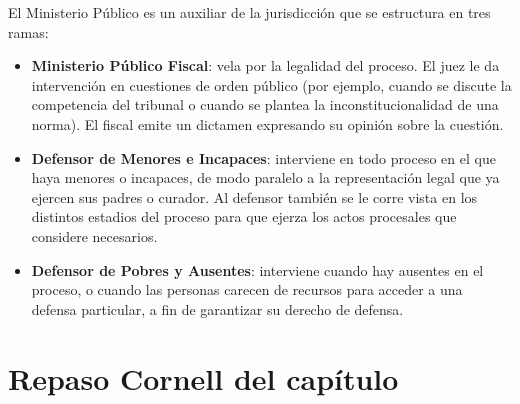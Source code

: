 \documentclass[12pt,oneside]{book}
\begin{document}
El Ministerio Público es un auxiliar de la jurisdicción que se estructura en tres ramas:

\begin{itemize}
    \item \textbf{Ministerio Público Fiscal}: vela por la legalidad del proceso. El juez le da intervención en cuestiones de orden público (por ejemplo, cuando se discute la competencia del tribunal o cuando se plantea la inconstitucionalidad de una norma). El fiscal emite un dictamen expresando su opinión sobre la cuestión.
    \item \textbf{Defensor de Menores e Incapaces}: interviene en todo proceso en el que haya menores o incapaces, de modo paralelo a la representación legal que ya ejercen sus padres o curador. Al defensor también se le corre vista en los distintos estadios del proceso para que ejerza los actos procesales que considere necesarios.
    \item \textbf{Defensor de Pobres y Ausentes}: interviene cuando hay ausentes en el proceso, o cuando las personas carecen de recursos para acceder a una defensa particular, a fin de garantizar su derecho de defensa.
\end{itemize}

\section*{Repaso Cornell del capítulo}
\end{document}
